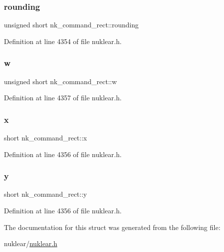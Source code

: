 \subsubsection{\texorpdfstring{rounding}{rounding}}
{\footnotesize\ttfamily unsigned short nk\+\_\+command\+\_\+rect\+::rounding}



Definition at line 4354 of file nuklear.\+h.

\mbox{\label{structnk__command__rect_a4f1ab19724e091adb07766db30aef2a3}} 
\subsubsection{\texorpdfstring{w}{w}}
{\footnotesize\ttfamily unsigned short nk\+\_\+command\+\_\+rect\+::w}



Definition at line 4357 of file nuklear.\+h.

\mbox{\label{structnk__command__rect_af6a275761f7d8eef83312ddb18f1fd9a}} 
\subsubsection{\texorpdfstring{x}{x}}
{\footnotesize\ttfamily short nk\+\_\+command\+\_\+rect\+::x}



Definition at line 4356 of file nuklear.\+h.

\mbox{\label{structnk__command__rect_a15646d8a746934d4748a9761b9b9a6e6}} 
\subsubsection{\texorpdfstring{y}{y}}
{\footnotesize\ttfamily short nk\+\_\+command\+\_\+rect\+::y}



Definition at line 4356 of file nuklear.\+h.



The documentation for this struct was generated from the following file\+:\begin{DoxyCompactItemize}
\item 
nuklear/\mbox{\hyperlink{nuklear_8h}{nuklear.\+h}}\end{DoxyCompactItemize}

